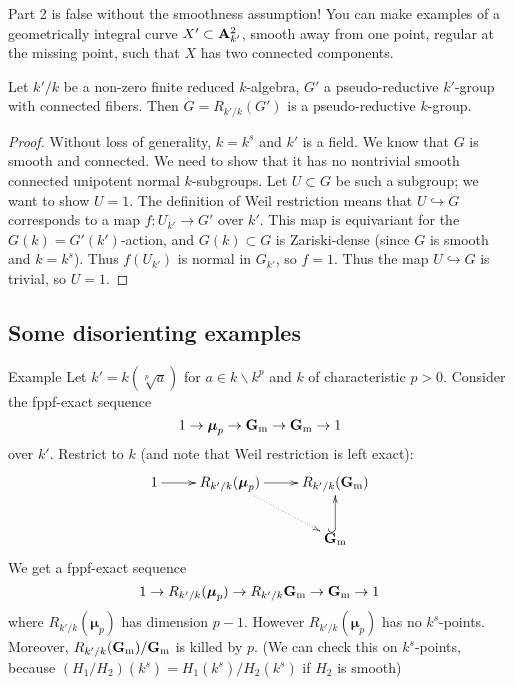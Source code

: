 Part 2 is false without the smoothness assumption! You can make examples of a 
geometrically integral curve $X'\subset \mathbf{A}_{k'}^2$, smooth away from one point, 
regular at the missing point, such that $X$ has two connected components. 

\begin{prop}
Let $k'/k$ be a non-zero finite reduced $k$-algebra, $G'$ a pseudo-reductive 
$k'$-group with connected fibers. Then $G=R_{k'/k} (G')$ is a pseudo-reductive 
$k$-group. 
\end{prop}
\begin{proof}
Without loss of generality, $k=k^s$ and $k'$ is a field. 
We know that $G$ is smooth and connected. We need to show that it has no 
nontrivial smooth connected unipotent normal $k$-subgroups. Let 
$U\subset G$ be such a subgroup; we want to show $U=1$. The definition 
of Weil restriction means that $U\hookrightarrow G$ corresponds to a map 
$f:U_{k'} \to G'$ over $k'$. This map is equivariant for the 
$G(k)=G'(k')$-action, and $G(k)\subset G$ is Zariski-dense (since $G$ is smooth 
and $k=k^s$). Thus $f(U_{k'})$ is normal in $G_{k'}$, so $f=1$. Thus the 
map $U\hookrightarrow G$ is trivial, so $U=1$. 
\end{proof}





\subsection{Some disorienting examples}

\begin{enonce}[remark]{Example}
Let $k'=k(\sqrt[p] a)$ for $a\in k\smallsetminus k^p$ and $k$ of characteristic 
$p>0$. Consider the fppf-exact sequence 
\[
  1 \to \boldsymbol\mu_p \to \mathbf{G}_{\mathrm{m}} \to \mathbf{G}_{\mathrm{m}} \to 1 
\]
over $k'$. Restrict to $k$ (and note that Weil restriction is left exact): 
\[\xymatrix{
  1 \ar[r] 
    & R_{k'/k}(\boldsymbol\mu_p) \ar[r] \ar@{.>}[dr] 
    & R_{k'/k}(\dG_\mult) \\
  & & \dG_\mult \ar@{^{(}->}[u] 
}\]
We get a fppf-exact sequence 
\[
  1 \to R_{k'/k}(\boldsymbol\mu_p) \to R_{k'/k} \mathbf{G}_{\mathrm{m}} \to \mathbf{G}_{\mathrm{m}} \to 1 
\]
where $R_{k'/k}(\boldsymbol\mu_p)$ has dimension $p-1$. However 
$R_{k'/k}(\boldsymbol\mu_p)$ has no $k^s$-points. Moreover, 
$R_{k'/k}(\mathbf{G}_{\mathrm{m}})/\mathbf{G}_{\mathrm{m}}$ is killed by $p$. (We can check this on 
$k^s$-points, because $(H_1/H_2)(k^s)=H_1(k^s)/H_2(k^s)$ if 
$H_2$ is smooth) 
\end{enonce}

